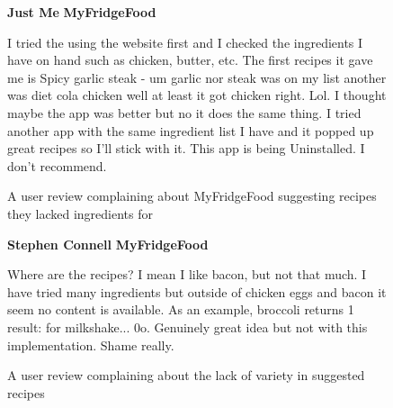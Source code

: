 \newcommand{\review}[6]{
    \begin{figure}[H]
        \caption{#1}
        \label{#2}

        \textbf{#3} #4
        \hfill\textbf{#5}

        #6
    \end{figure}
}

\review
    {A user review complaining about MyFridgeFood suggesting recipes they lacked ingredients for}
    {fig:review_missing_ingredients}
    {Just Me}
    {\dingstarfull \dingstarempty \dingstarempty \dingstarempty \dingstarempty}
    {MyFridgeFood}
    {
        I tried the using the website first and I checked the ingredients I have on hand such as chicken,
        butter, etc. The first recipes it gave me is Spicy garlic steak - um garlic nor steak was on my list another was
        diet cola chicken well at least it got chicken right. Lol. I thought maybe the app was better but no it does the same thing.
        I tried another app with the same ingredient list I have and it popped up great recipes so I'll stick with it.
        This app is being Uninstalled. I don't recommend.
    }

\review
    {A user review complaining about the lack of variety in suggested recipes}
    {fig:review_lack_variety}
    {Stephen Connell}
    {\dingstarfull \dingstarfull \dingstarempty \dingstarempty \dingstarempty}
    {MyFridgeFood}
    {
        Where are the recipes? I mean I like bacon, but not that much. I have tried many ingredients
        but outside of chicken eggs and bacon it seem no content is available. As an example,
        broccoli returns 1 result: for milkshake... 0\textunderscore o. Genuinely great idea but not with this
        implementation. Shame really.
    }
